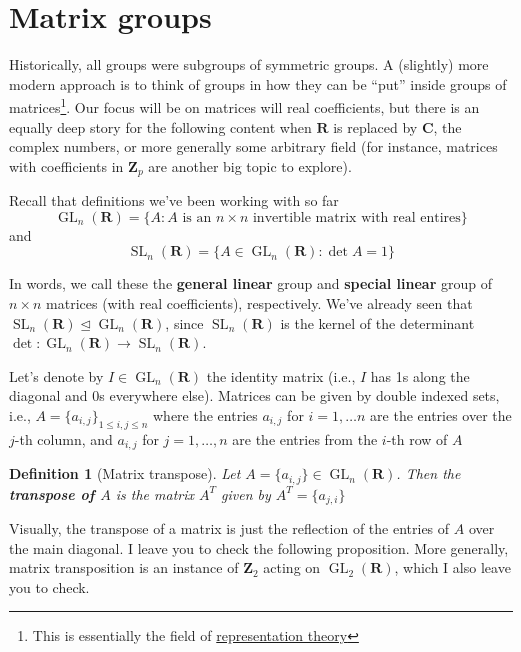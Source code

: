 \documentclass[12pt]{article}
\numberwithin{equation}{subsection}
\newtheorem{defn}[subsection]{Definition}
\theoremstyle{note}
\newcommand{\GL}{\operatorname{GL}}
\newcommand{\SL}{\operatorname{SL}}
\newcommand{\nrml}{\trianglelefteq}
\begin{document}
\section{Matrix groups} 

Historically, all groups were subgroups of symmetric groups. A (slightly) more modern approach is to think of groups in how they can be ``put'' inside groups of matrices\footnote{This is essentially the field of \href{https://en.wikipedia.org/wiki/Representation_theory}{representation theory}}. Our focus will be on matrices will real coefficients, but there is an equally deep story for the following content when $\mathbf{R}$ is replaced by $\mathbf{C}$, the complex numbers, or more generally some arbitrary field (for instance, matrices with coefficients in $\mathbf{Z}_p$ are another big topic to explore). 

Recall that definitions we've been working with so far \begin{equation} \GL_n(\mathbf{R}) = \{A : \text{$A$ is an $n\times n$ invertible matrix with real entires}\}\end{equation} and 
\begin{equation} \SL_n(\mathbf{R}) = \{A\in \GL_n(\mathbf{R}) : \det A=1\}\end{equation}

In words, we call these the \textbf{general linear} group and \textbf{special linear} group of $n\times n$ matrices (with real coefficients), respectively. We've already seen that $\SL_n (\mathbf{R})\nrml \GL_n(\mathbf{R})$, since $\SL_n(\mathbf{R})$ is the kernel of the determinant $\det \colon \GL_n (\mathbf{R})\to\SL_n(\mathbf{R})$. 




Let's denote by $I\in \GL_n(\mathbf{R})$ the identity matrix (i.e., $I$ has 1s along the diagonal and 0s everywhere else). Matrices can be given by double indexed sets, i.e., $A=\{a_{i,j}\}_{1\leq i,j\leq n}$ where the entries $a_{i,j}$ for $i=1,\dots n$ are the entries over the $j$-th column, and $a_{i,j}$ for $j=1,\dots,n$ are the entries from the $i$-th row of $A$

\begin{defn}[Matrix transpose] Let $A=\{a_{i,j}\}\in \GL_n(\mathbf{R})$. Then the \textbf{transpose of $A$} is the matrix $A^T$ given by $A^T=\{a_{j,i}\}$
\end{defn}



Visually, the transpose of a matrix is just the reflection of the entries of $A$ over the main diagonal. I leave you to check the following proposition. More generally, matrix transposition is an instance of $\mathbf{Z}_2$ acting on $\GL_2(\mathbf{R})$, which I also leave you to check. 
\end{document}

